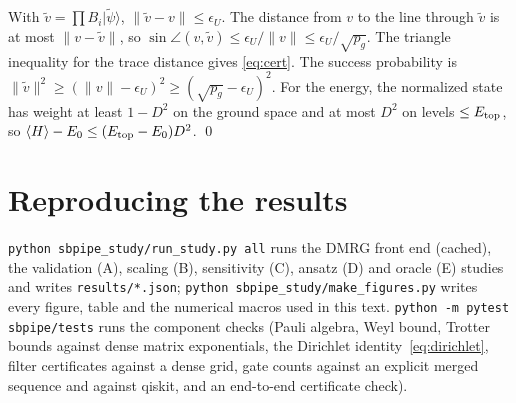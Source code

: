 \documentclass[aps,pra,twocolumn,superscriptaddress,nofootinbib]{revtex4-2}
\newcommand{\ket}[1]{|#1\rangle}
\newcommand{\norm}[1]{\lVert#1\rVert}
\begin{document}
With $\tilde v=\prod B_i\ket{\tilde\psi}$, $\norm{\tilde v-v}\le\epsilon_U$. The distance from $v$ to the line
through $\tilde v$ is at most $\norm{v-\tilde v}$, so $\sin\angle(v,\tilde v)\le\epsilon_U/\norm v\le
\epsilon_U/\sqrt{p_g}$. The triangle inequality for the trace distance gives \eqref{eq:cert}. The
success probability is $\norm{\tilde v}^2\ge(\norm v-\epsilon_U)^2\ge(\sqrt{p_g}-\epsilon_U)^2$. For
the energy, the normalized state has weight at least $1-D^2$ on the ground space and at most $D^2$ on
levels $\le E_{\rm top}$, so $\langle H\rangle-E_0\le(E_{\rm top}-E_0)D^2$. \qed

\section{Reproducing the results}
\label{app:repro}

\texttt{python sbpipe\_study/run\_study.py all} runs the DMRG front end (cached), the validation (A),
scaling (B), sensitivity (C), ansatz (D) and oracle (E) studies and writes \texttt{results/*.json};
\texttt{python sbpipe\_study/make\_figures.py} writes every figure, table and the numerical macros used
in this text. \texttt{python -m pytest sbpipe/tests} runs the component checks (Pauli algebra, Weyl
bound, Trotter bounds against dense matrix exponentials, the Dirichlet identity~\eqref{eq:dirichlet},
filter certificates against a dense grid, gate counts against an explicit merged sequence and against
qiskit, and an end-to-end certificate check).
\end{document}
